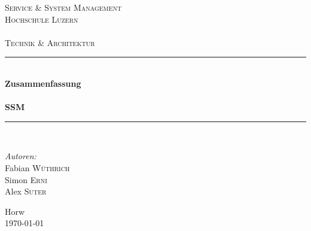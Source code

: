 \begin{titlepage}
	
	\begin{center}
		
		\textsc{\LARGE Service \& System Management}\\[1.5cm]
		
		\textsc{\Large Hochschule Luzern\\
			~\\
			Technik \& Architektur}\\[0.5cm]
		
		\vfill{}
		
		\newcommand{\HRule}{\rule{\linewidth}{0.5mm}}
		\HRule \\[0.4cm]
		{   \Huge \bfseries Zusammenfassung\\
			~\\
			\large SSM}\\[0.4cm]
		
		\HRule \\[1.5cm]
		
		\begin{minipage}{0.4\textwidth}
			\begin{flushleft} \large
				\emph{Autoren:}\\
				Fabian \textsc{Wüthrich}\\
				Simon \textsc{Erni}\\
				Alex \textsc{Suter}
			\end{flushleft}
		\end{minipage}
		\hfill
		\begin{minipage}{0.4\textwidth}
			\begin{flushright} \large
			\end{flushright}
		\end{minipage}
		
		\vfill{}
		\vfill{}
		\vfill{}
		
		{\large Horw\\ \today}
		
	\end{center}
	
\end{titlepage}
